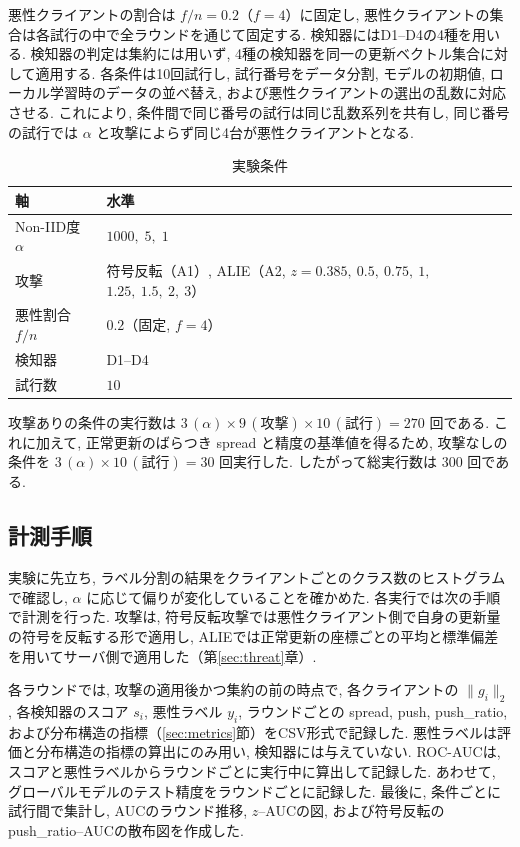 \documentclass[a4j, twocolumn, dvipdfmx]{jsarticle}
\newcommand{\PushRatio}{\textrm{push\_ratio}}
\newcommand{\Spread}{\textrm{spread}}
\newcommand{\Push}{\textrm{push}}
\begin{document}
悪性クライアントの割合は $f/n = 0.2$（$f=4$）に固定し, 悪性クライアントの集合は各試行の中で全ラウンドを通じて固定する. 検知器にはD1--D4の4種を用いる. 検知器の判定は集約には用いず, 4種の検知器を同一の更新ベクトル集合に対して適用する. 各条件は10回試行し, 試行番号をデータ分割, モデルの初期値, ローカル学習時のデータの並べ替え, および悪性クライアントの選出の乱数に対応させる. これにより, 条件間で同じ番号の試行は同じ乱数系列を共有し, 同じ番号の試行では $\alpha$ と攻撃によらず同じ4台が悪性クライアントとなる.

\begin{table}[t]
\centering
\caption{実験条件}
\label{tab:exp-conditions}
\begin{tabular}{@{}lP{5.0cm}@{}}
\toprule
軸 & 水準 \\
\midrule
Non-IID度 $\alpha$ & $1000,\; 5,\; 1$ \\
攻撃 & 符号反転（A1）, ALIE（A2, $z=0.385,\ 0.5,\ 0.75,\ 1,$ $1.25,\ 1.5,\ 2,\ 3$） \\
悪性割合 $f/n$ & $0.2$（固定, $f=4$） \\
検知器 & D1--D4 \\
試行数 & $10$ \\
\bottomrule
\end{tabular}
\end{table}

攻撃ありの条件の実行数は $3\,(\alpha) \times 9\,(\text{攻撃}) \times 10\,(\text{試行}) = 270$ 回である. これに加えて, 正常更新のばらつき \Spread{} と精度の基準値を得るため, 攻撃なしの条件を $3\,(\alpha) \times 10\,(\text{試行}) = 30$ 回実行した. したがって総実行数は $300$ 回である.


\subsection{計測手順}
\label{sec:exp-procedure}

実験に先立ち, ラベル分割の結果をクライアントごとのクラス数のヒストグラムで確認し, $\alpha$ に応じて偏りが変化していることを確かめた. 各実行では次の手順で計測を行った. 攻撃は, 符号反転攻撃では悪性クライアント側で自身の更新量の符号を反転する形で適用し, ALIEでは正常更新の座標ごとの平均と標準偏差を用いてサーバ側で適用した（第\ref{sec:threat}章）.

各ラウンドでは, 攻撃の適用後かつ集約の前の時点で, 各クライアントの $\|g_i\|_2$, 各検知器のスコア $s_i$, 悪性ラベル $y_i$, ラウンドごとの \Spread{}, \Push{}, \PushRatio{}, および分布構造の指標（\ref{sec:metrics}節）をCSV形式で記録した. 悪性ラベルは評価と分布構造の指標の算出にのみ用い, 検知器には与えていない. ROC-AUCは, スコアと悪性ラベルからラウンドごとに実行中に算出して記録した. あわせて, グローバルモデルのテスト精度をラウンドごとに記録した. 最後に, 条件ごとに試行間で集計し, AUCのラウンド推移, $z$--AUCの図, および符号反転の \PushRatio{}--AUCの散布図を作成した.
\end{document}
